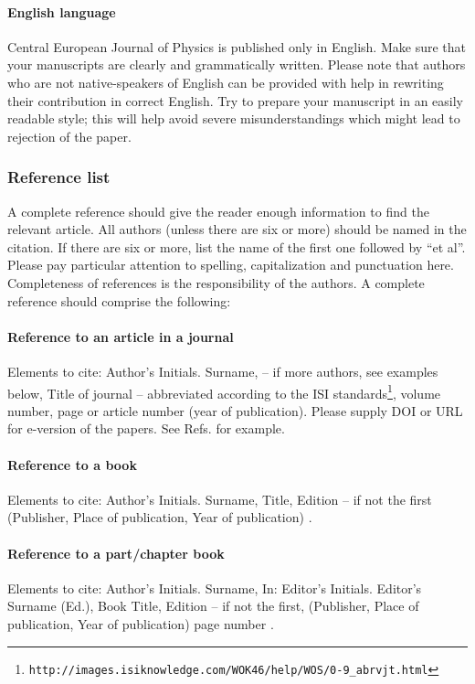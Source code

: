 \documentclass{lpaper} %
\begin{document}
\paragraph{English language}
    Central European Journal of Physics is published only in English. Make sure that your manuscripts are clearly and grammatically written. Please note that authors who are not native-speakers of English can be provided with help in rewriting their contribution in correct English. Try to prepare your manuscript in an easily readable style; this will help avoid severe misunderstandings which might lead to rejection of the paper.

\subsubsection{Reference list}

A complete reference should give the reader enough information to find the relevant article. All authors (unless there are six or more) should be named in the citation. If there are six or more, list the name of the first one followed by ``et al''. Please pay particular attention to spelling, capitalization and punctuation here. Completeness of references is the responsibility of the authors. A complete reference should comprise the following:

\paragraph{Reference to an article in a journal}
Elements to cite:
Author's Initials. Surname, -- if more authors, see examples below,
Title of journal -- abbreviated according to the ISI standards\footnote{\tt http://images.isiknowledge.com/WOK46/help/WOS/0-9\_abrvjt.html},
volume number, page or article number (year of publication).
Please supply DOI or URL for e-version of the papers.
See Refs. \cite{journal-1, journal-2, journal-3, journal-4, journal-5, journal-6, journal-7, journal-8} for example.

\paragraph{Reference to a book}
Elements to cite:
Author's Initials. Surname,
Title,
Edition -- if not the first
(Publisher, Place of publication, Year of publication)
\cite{book}.


\paragraph{Reference to a part/chapter book}
Elements to cite:
Author's Initials. Surname,
In: Editor's Initials. Editor's Surname (Ed.),
Book Title,
Edition -- if not the first,
(Publisher, Place of publication, Year of publication)
page number \cite{chapter}.
\end{document}

